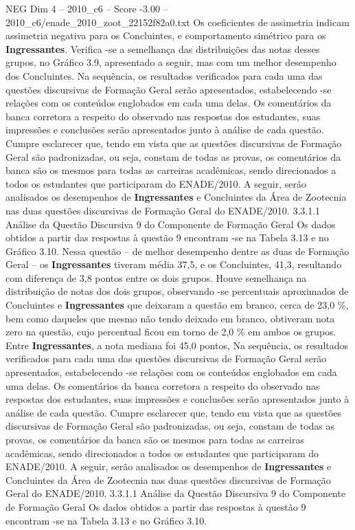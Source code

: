 \begin{textsample}{NEG Dim 4 – 2010\_c6 – Score -3.00 – 2010\_c6/enade\_2010\_zoot\_22152f82a0.txt}
Os coeficientes de assimetria indicam assimetria negativa para os Concluintes, e comportamento simétrico para os \textbf{Ingressantes}.
Verifica -se a semelhança das distribuições das notas desses grupos, no Gráfico 3.9, apresentado a seguir, mas com um melhor desempenho dos Concluintes.
Na sequência, os resultados verificados para cada uma das questões discursivas de Formação Geral serão apresentados, estabelecendo -se relações com os conteúdos englobados em cada uma delas.
Os comentários da banca corretora a respeito do observado nas respostas dos estudantes, suas impressões e conclusões serão apresentados junto à análise de cada questão.
Cumpre esclarecer que, tendo em vista que as questões discursivas de Formação Geral são padronizadas, ou seja, constam de todas as provas, os comentários da banca são os mesmos para todas as carreiras acadêmicas, sendo direcionados a todos os estudantes que participaram do ENADE/2010.
A seguir, serão analisados os desempenhos de \textbf{Ingressantes} e Concluintes da Área de Zootecnia nas duas questões discursivas de Formação Geral do ENADE/2010. 3.3.1.1 Análise da Questão Discursiva 9 do Componente de Formação Geral Os dados obtidos a partir das respostas à questão 9 encontram -se na Tabela 3.13 e no Gráfico 3.10.
Nessa questão – de melhor desempenho dentre as duas de Formação Geral – os \textbf{Ingressantes} tiveram média 37,5, e os Concluintes, 41,3, resultando com diferença de 3,8 pontos entre os dois grupos.
Houve semelhança na distribuição de notas dos dois grupos, observando -se percentuais aproximados de Concluintes e \textbf{Ingressantes} que deixaram a questão em branco, cerca de 23,0 \%, bem como daqueles que mesmo não tendo deixado em branco, obtiveram nota zero na questão, cujo percentual ficou em torno de 2,0 \% em ambos os grupos.
Entre \textbf{Ingressantes}, a nota mediana foi 45,0 pontos, Na sequência, os resultados verificados para cada uma das questões discursivas de Formação Geral serão apresentados, estabelecendo -se relações com os conteúdos englobados em cada uma delas.
Os comentários da banca corretora a respeito do observado nas respostas dos estudantes, suas impressões e conclusões serão apresentados junto à análise de cada questão.
Cumpre esclarecer que, tendo em vista que as questões discursivas de Formação Geral são padronizadas, ou seja, constam de todas as provas, os comentários da banca são os mesmos para todas as carreiras acadêmicas, sendo direcionados a todos os estudantes que participaram do ENADE/2010.
A seguir, serão analisados os desempenhos de \textbf{Ingressantes} e Concluintes da Área de Zootecnia nas duas questões discursivas de Formação Geral do ENADE/2010. 3.3.1.1 Análise da Questão Discursiva 9 do Componente de Formação Geral Os dados obtidos a partir das respostas à questão 9 encontram -se na Tabela 3.13 e no Gráfico 3.10.

\end{textsample}
